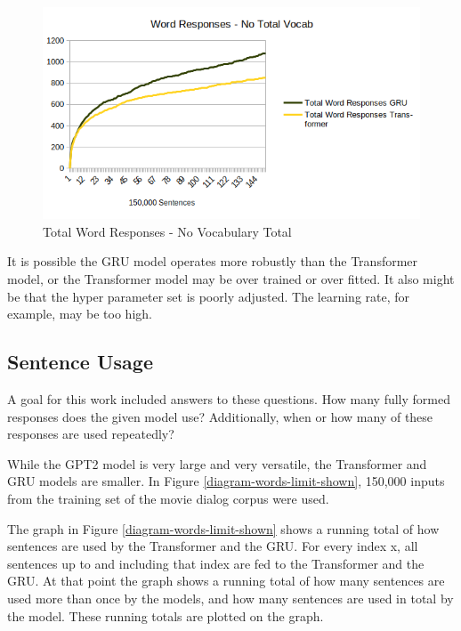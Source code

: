 \begin{figure}[H]
	\begin{center}
		\includegraphics[scale=0.75]{diagram-output-total-responses-04}
		
		
	\end{center}
	\caption[Total Word Responses]{Total Word Responses - No Vocabulary Total}
	\label{diagram-words-no-voc-total}
	
\end{figure}

It is possible the GRU model operates more robustly than the Transformer model, or the Transformer model may be over trained or over fitted. It also might be that the hyper parameter set is poorly adjusted. The learning rate, for example, may be too high.

\subsection{Sentence Usage}
A goal for this work included answers to these questions.
How many fully formed responses does the given model use? Additionally, when or how many of these responses are used repeatedly?

While the GPT2 model is very large and very versatile, the Transformer and GRU models are smaller. In Figure \ref{diagram-words-limit-shown}, 150,000 inputs from the training set of the movie dialog corpus were used. 

The graph in Figure \ref{diagram-words-limit-shown} shows a running total of how sentences are used by the Transformer and the GRU. For every index x, all sentences up to and including that index are fed to the Transformer and the GRU. At that point the graph shows a running total of how many sentences are used more than once by the models, and how many sentences are used in total by the model. These running totals are plotted on the graph.

